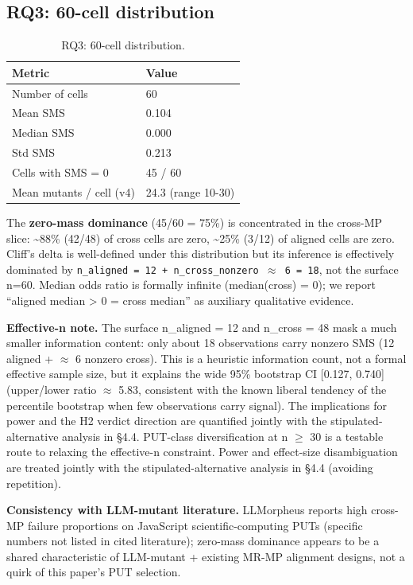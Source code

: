 \documentclass[acmsmall,screen,review]{acmart}
\begin{document}
\subsection{RQ3: 60-cell distribution}\label{rq1-60-cell-distribution}

{\def\LTcaptype{table} %
\begin{longtable}[]{@{}ll@{}}
\caption{RQ3: 60-cell distribution.}\label{tab:p2-08}\\
\toprule\noalign{}
Metric & Value \\
\midrule\noalign{}
\endhead
\bottomrule\noalign{}
\endlastfoot
Number of cells & 60 \\
Mean SMS & 0.104 \\
Median SMS & 0.000 \\
Std SMS & 0.213 \\
Cells with SMS = 0 & 45 / 60 \\
Mean mutants / cell (v4) & 24.3 (range 10-30) \\
\end{longtable}
}

The \textbf{zero-mass dominance} (45/60 = 75\%) is concentrated in the
cross-MP slice: \textasciitilde88\% (42/48) of cross cells are zero,
\textasciitilde25\% (3/12) of aligned cells are zero. Cliff's delta is
well-defined under this distribution but its inference is effectively
dominated by
\texttt{n\_aligned\ =\ 12\ +\ n\_cross\_nonzero\ $\approx$\ 6\ =\ 18}, not the
surface n=60. Median odds ratio is formally infinite (median(cross) =
0); we report ``aligned median \textgreater{} 0 = cross median'' as
auxiliary qualitative evidence.

\textbf{Effective-n note.} The surface n\_aligned = 12 and n\_cross = 48
mask a much smaller information content: only about 18 observations carry
nonzero SMS (12 aligned + $\approx$ 6 nonzero cross). This is a heuristic
information count, not a formal effective sample size, but it explains the
wide 95\% bootstrap CI {[}0.127, 0.740{]} (upper/lower ratio $\approx$
5.83, consistent with the known liberal tendency of the percentile
bootstrap when few observations carry signal). The implications for power and the H2 verdict direction are
quantified jointly with the stipulated-alternative analysis in §4.4.
PUT-class diversification at n $\geq$ 30 is a testable route to relaxing
the effective-n constraint. Power and effect-size disambiguation are
treated jointly with the stipulated-alternative analysis in §4.4
(avoiding repetition).

\textbf{Consistency with LLM-mutant literature.} \citet{tip2025llmorpheus}
LLMorpheus reports high cross-MP failure proportions on JavaScript
scientific-computing PUTs (specific numbers not listed in cited
literature); zero-mass dominance appears to be a shared characteristic
of LLM-mutant + existing MR-MP alignment designs, not a quirk of this
paper's PUT selection.
\end{document}
